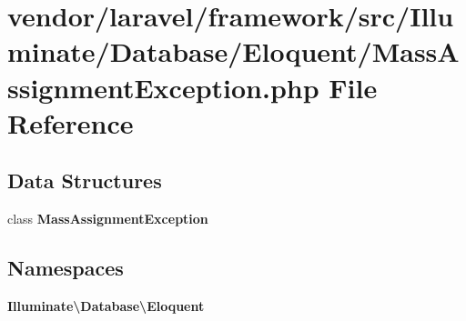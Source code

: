 \section{vendor/laravel/framework/src/\+Illuminate/\+Database/\+Eloquent/\+Mass\+Assignment\+Exception.php File Reference}
\label{_mass_assignment_exception_8php}
\subsection*{Data Structures}
\begin{DoxyCompactItemize}
\item 
class {\bf Mass\+Assignment\+Exception}
\end{DoxyCompactItemize}
\subsection*{Namespaces}
\begin{DoxyCompactItemize}
\item 
 {\bf Illuminate\textbackslash{}\+Database\textbackslash{}\+Eloquent}
\end{DoxyCompactItemize}
